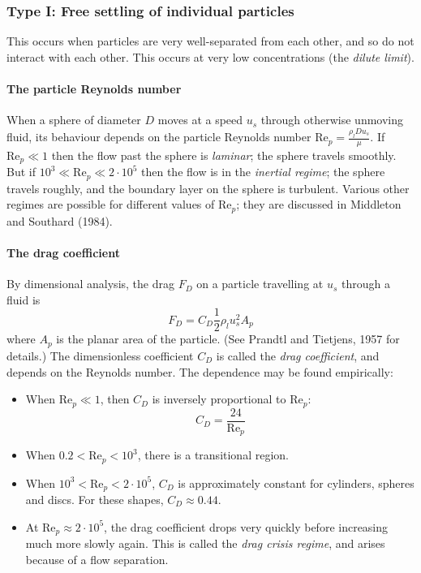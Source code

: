 \subsubsection{Type I: Free settling of individual particles} 

This occurs when particles are very well-separated from each other, and so do not interact with each other. This occurs at very low concentrations (the \textit{dilute limit}).

\paragraph{The particle Reynolds number} When a sphere of diameter $D$ moves at a speed $u_s$ through otherwise unmoving fluid, its behaviour depends on the particle Reynolds number $\mathrm{Re}_p=\frac{\rho_lDu_s}{\mu}$.  If $\mathrm{Re}_p\ll1$ then the flow past the sphere is \textit{laminar}; the sphere travels smoothly. But if $10^3 \ll \mathrm{Re}_p \ll 2\cdot10^5$ then the flow is in the \textit{inertial regime}; the sphere travels roughly, and the boundary layer on the sphere is turbulent. Various other regimes are possible for different values of $\mathrm{Re}_p$; they are discussed in Middleton and Southard (1984). 

\paragraph{The drag coefficient} By dimensional analysis, the drag $F_D$ on a particle travelling at $u_s$ through a fluid is
\begin{equation}
 F_D = C_D\frac{1}{2}\rho_lu_s^2A_p
\end{equation}
where $A_p$ is the planar area of the particle. (See Prandtl and Tietjens, 1957 for details.) The dimensionless coefficient $C_D$ is called the \textit{drag coefficient}, and depends on the Reynolds number. The dependence may be found empirically:
\begin{itemize}
	\item When $\mathrm{Re}_p\ll1$, then $C_D$ is inversely proportional to $\mathrm{Re}_p$:
	\begin{equation}
    		C_D = \frac{24}{\mathrm{Re}_p}
	\end{equation}
	\item When $0.2 < \mathrm{Re}_p < 10^3$, there is a transitional region.
	\item When $10^3 < \mathrm{Re}_p < 2\cdot10^5$, $C_D$ is approximately constant for cylinders, spheres and discs. For these shapes, $C_D \approx 0.44$.
	\item At $\mathrm{Re}_p\approx2\cdot10^5$, the drag coefficient drops very quickly before increasing much more slowly again. This is called the \textit{drag crisis regime}, and arises because of a flow separation.
\end{itemize}

